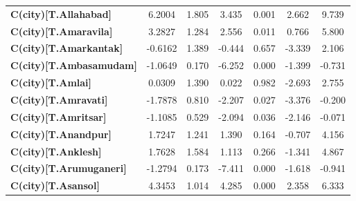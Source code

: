 \begin{center}
\begin{tabular}{lcccccc}
\textbf{C(city)[T.Allahabad]}                                                                       &       6.2004  &        1.805     &     3.435  &         0.001        &        2.662    &        9.739     \\
\textbf{C(city)[T.Amaravila]}                                                                       &       3.2827  &        1.284     &     2.556  &         0.011        &        0.766    &        5.800     \\
\textbf{C(city)[T.Amarkantak]}                                                                      &      -0.6162  &        1.389     &    -0.444  &         0.657        &       -3.339    &        2.106     \\
\textbf{C(city)[T.Ambasamudam]}                                                                     &      -1.0649  &        0.170     &    -6.252  &         0.000        &       -1.399    &       -0.731     \\
\textbf{C(city)[T.Amlai]}                                                                           &       0.0309  &        1.390     &     0.022  &         0.982        &       -2.693    &        2.755     \\
\textbf{C(city)[T.Amravati]}                                                                        &      -1.7878  &        0.810     &    -2.207  &         0.027        &       -3.376    &       -0.200     \\
\textbf{C(city)[T.Amritsar]}                                                                        &      -1.1085  &        0.529     &    -2.094  &         0.036        &       -2.146    &       -0.071     \\
\textbf{C(city)[T.Anandpur]}                                                                        &       1.7247  &        1.241     &     1.390  &         0.164        &       -0.707    &        4.156     \\
\textbf{C(city)[T.Anklesh]}                                                                         &       1.7628  &        1.584     &     1.113  &         0.266        &       -1.341    &        4.867     \\
\textbf{C(city)[T.Arumuganeri]}                                                                     &      -1.2794  &        0.173     &    -7.411  &         0.000        &       -1.618    &       -0.941     \\
\textbf{C(city)[T.Asansol]}                                                                         &       4.3453  &        1.014     &     4.285  &         0.000        &        2.358    &        6.333     \\

\end{tabular}
\end{center}
